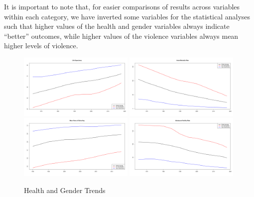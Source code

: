\documentclass[12pt]{article}
\begin{document}
It is important to note that, for easier comparisons of results across variables within each category, we have inverted some variables for the statistical analyses such that higher values of the health and gender variables always indicate \enquote{better} outcomes, while higher values of the violence variables always mean higher levels of violence.

\begin{figure}
    \centering
    \caption{Health and Gender Trends}
    \label{trends}
    \includegraphics[width=0.49\textwidth]{trend_life_exp_wpp.pdf}
    \includegraphics[width=0.49\textwidth]{trend_imr_wpp.pdf}
    \includegraphics[width=0.49\textwidth]{trend_mys_ratio_hdr.pdf}
    \includegraphics[width=0.49\textwidth]{trend_asfr_adol_wpp.pdf}
\end{figure}
\end{document}
